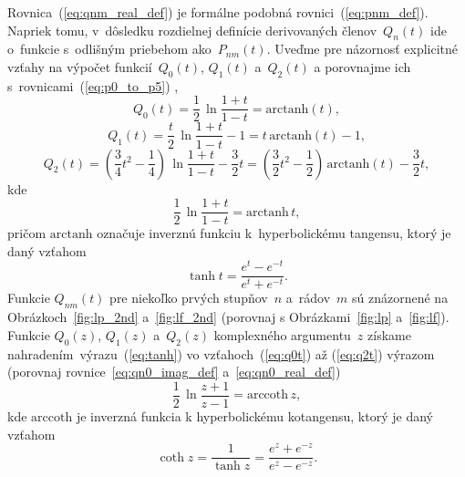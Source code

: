 \documentclass[a4paper,12pt]{book}
\begin{document}
Rovnica~(\ref{eq:qnm_real_def}) je formálne podobná rovnici~(\ref{eq:pnm_def}).  
Napriek tomu, v~dôsledku rozdielnej definície derivovaných členov~$Q_n(t)$ ide 
o~funkcie s~odlišným priebehom ako~$P_{nm}(t)$.  Uveďme pre názornosť 
explicitné vzťahy na výpočet funkcií~$Q_0\left( t \right)$, $Q_1\left( 
t \right)$ a~$Q_2\left( t \right)$ a porovnajme ich 
s~rovnicami~(\ref{eq:p0_to_p5})
\parencite{MoritzPhysicalGeodesy},
%
\begin{equation}
\label{eq:q0t}
Q_0(t) = \frac{1}{2} \, \ln\frac{1 + t}{1 - t} = \mathrm{arctanh}(t){,}
\end{equation}
%
\begin{equation}
\label{eq:q1t}
Q_1(t) = \frac{t}{2} \, \ln\frac{1 + t}{1 - t} - 1 = t \, \mathrm{arctanh}(t)- 
 1{,}
\end{equation}
%
\begin{equation}
\label{eq:q2t}
Q_2(t) = \left( \frac{3}{4} t^2 - \frac{1}{4} \right) \, \ln\frac{1 + t}{1 - t} 
- \frac{3}{2}t = \left( \frac{3}{2} t^2 - \frac{1}{2} \right) \, 
\mathrm{arctanh}(t) - \frac{3}{2}t{,}
\end{equation}
%
kde
%
\begin{equation}
\label{eq:tanh}
\frac{1}{2} \, \ln \frac{1 + t}{1 - t} = \mathrm{arctanh} \, t{,}
\end{equation}
%
pričom $\mathrm{arctanh}$ označuje inverznú funkciu k~hyperbolickému tangensu, 
ktorý je daný vzťahom \parencite{Gradshteyn2007}
%
\begin{equation}
\tanh t = \frac{e^t - e^{-t}}{e^t + e^{-t}}{.}
\end{equation}
%
Funkcie $Q_{nm}(t)$ pre niekoľko prvých stupňov~$n$ a~rádov~$m$ sú znázornené 
na Obrázkoch~\ref{fig:lp_2nd} a~\ref{fig:lf_2nd} (porovnaj 
s Obrázkami~\ref{fig:lp} a~\ref{fig:lf}).  Funkcie $Q_0\left( z \right)$, 
$Q_1\left( z \right)$ a~$Q_2\left( z \right)$ komplexného argumentu~$z$ získame 
nahradením~výrazu~(\ref{eq:tanh}) vo vzťahoch~(\ref{eq:q0t}) až (\ref{eq:q2t}) 
výrazom (porovnaj rovnice~\ref{eq:qn0_imag_def} a~\ref{eq:qn0_real_def})
%
\begin{equation}
\label{eq:arccoth}
\frac{1}{2} \, \ln \frac{z + 1}{z - 1} = \mathrm{arccoth} \, z{,}
\end{equation}
%
kde $\mathrm{arccoth}$ je inverzná funkcia k hyperbolickému kotangensu, ktorý 
je daný vzťahom \parencite{Gradshteyn2007}
%
\begin{equation}
\coth z = \frac{1}{\tanh z} =  \frac{e^z + e^{-z}}{e^z - e^{-z}}{.}
\end{equation}
\end{document}
